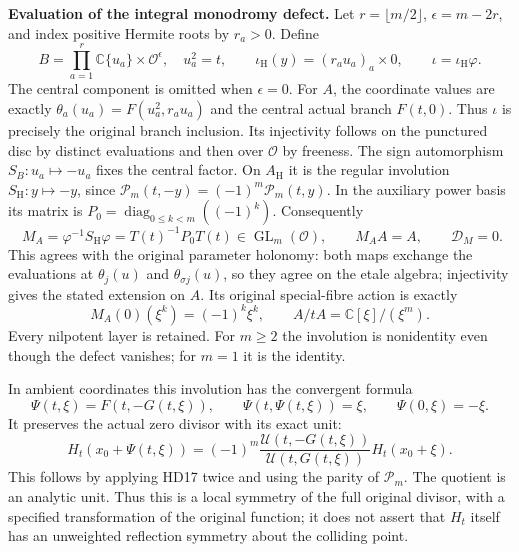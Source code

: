 \documentclass[11pt,a4paper]{article}
\theoremstyle{definition}\newtheorem{definition}[theorem]{Definition}
\begin{document}
\HD\textbf{Evaluation of the integral monodromy defect.}
Let $r=\lfloor m/2\rfloor$, $\epsilon=m-2r$, and index positive
Hermite roots by $r_a>0$. Define
\[
 B=\prod_{a=1}^r\mathbb C\{u_a\}\times\mathcal O^\epsilon,\quad
 u_a^2=t,\qquad
 \iota_{\mathrm H}(y)=(r_au_a)_a\times0,\qquad
 \iota=\iota_{\mathrm H}\varphi .
 \tag{HD18}\label{hd:B}
\]
The central component is omitted when $\epsilon=0$.
For $A$, the coordinate values are exactly
$\theta_a(u_a)=F(u_a^2,r_au_a)$ and the central actual branch
$F(t,0)$. Thus $\iota$ is precisely the original branch inclusion.
Its injectivity follows on the punctured disc by distinct evaluations
and then over $\mathcal O$ by freeness.
The sign automorphism $S_B:u_a\mapsto-u_a$ fixes the central factor.
On $A_{\mathrm H}$ it is the regular involution
$S_{\mathrm H}:y\mapsto-y$, since
$\mathcal P_m(t,-y)=(-1)^m\mathcal P_m(t,y)$.
In the auxiliary power basis its matrix is
$P_0=\operatorname{diag}_{0\le k<m}((-1)^k)$.
Consequently
\[
 \boxed{\quad M_A=\varphi^{-1}S_{\mathrm H}\varphi
             =T(t)^{-1}P_0T(t)\in\operatorname{GL}_m(\mathcal O),
 \qquad M_AA=A,\qquad\mathcal D_M=0.\quad}
 \tag{HD19}\label{hd:vanishing}
\]
This agrees with the original parameter holonomy:
both maps exchange the evaluations at $\theta_j(u)$ and
$\theta_{\sigma j}(u)$, so they agree on the etale algebra;
injectivity gives the stated extension on $A$.
Its original special-fibre action is exactly
\[
 M_A(0)(\xi^k)=(-1)^k\xi^k,\qquad
 A/tA=\mathbb C[\xi]/(\xi^m).
 \tag{HD20}\label{hd:central}
\]
Every nilpotent layer is retained. For $m\ge2$ the involution is
nonidentity even though the defect vanishes; for $m=1$ it is
the identity.

In ambient coordinates this involution has the convergent formula
\[
 \Psi(t,\xi)=F(t,-G(t,\xi)),\qquad
 \Psi(t,\Psi(t,\xi))=\xi,\qquad \Psi(0,\xi)=-\xi .
 \tag{HD21}\label{hd:ambient}
\]
It preserves the actual zero divisor with its exact unit:
\[
 H_t(x_0+\Psi(t,\xi))
   =(-1)^m
     \frac{\mathcal U(t,-G(t,\xi))}{\mathcal U(t,G(t,\xi))}
       H_t(x_0+\xi).
 \tag{HD22}\label{hd:fullunit}
\]
This follows by applying HD17 twice and using the parity of
$\mathcal P_m$. The quotient is an analytic unit.
Thus this is a local symmetry of the full original divisor,
with a specified transformation of the original function;
it does not assert that $H_t$ itself has an unweighted reflection
symmetry about the colliding point.
\end{document}
